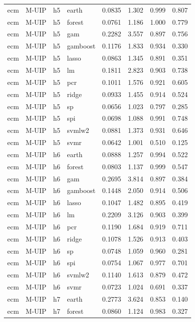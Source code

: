 \begin{ThreePartTable}
\begin{longtable}[t]{llclcccc}
\addlinespace
ecm & M-UIP & h5 & earth & 0.0835 & 1.302 & 0.999 & 0.807\\
ecm & M-UIP & h5 & forest & 0.0761 & 1.186 & 1.000 & 0.779\\
ecm & M-UIP & h5 & gam & 0.2282 & 3.557 & 0.897 & 0.756\\
ecm & M-UIP & h5 & gamboost & 0.1176 & 1.833 & 0.934 & 0.330\\
ecm & M-UIP & h5 & lasso & 0.0863 & 1.345 & 0.891 & 0.351\\
ecm & M-UIP & h5 & lm & 0.1811 & 2.823 & 0.903 & 0.738\\
ecm & M-UIP & h5 & pcr & 0.1011 & 1.576 & 0.921 & 0.605\\
ecm & M-UIP & h5 & ridge & 0.0933 & 1.455 & 0.914 & 0.524\\
ecm & M-UIP & h5 & sp & 0.0656 & 1.023 & 0.797 & 0.285\\
ecm & M-UIP & h5 & spi & 0.0698 & 1.088 & 0.991 & 0.748\\
ecm & M-UIP & h5 & svmlw2 & 0.0881 & 1.373 & 0.931 & 0.646\\
ecm & M-UIP & h5 & svmr & 0.0642 & 1.001 & 0.510 & 0.125\\
\addlinespace
ecm & M-UIP & h6 & earth & 0.0888 & 1.257 & 0.994 & 0.522\\
ecm & M-UIP & h6 & forest & 0.0803 & 1.137 & 0.999 & 0.547\\
ecm & M-UIP & h6 & gam & 0.2695 & 3.814 & 0.897 & 0.384\\
ecm & M-UIP & h6 & gamboost & 0.1448 & 2.050 & 0.914 & 0.506\\
ecm & M-UIP & h6 & lasso & 0.1047 & 1.482 & 0.895 & 0.419\\
ecm & M-UIP & h6 & lm & 0.2209 & 3.126 & 0.903 & 0.399\\
ecm & M-UIP & h6 & pcr & 0.1190 & 1.684 & 0.919 & 0.711\\
ecm & M-UIP & h6 & ridge & 0.1078 & 1.526 & 0.913 & 0.403\\
ecm & M-UIP & h6 & sp & 0.0748 & 1.059 & 0.960 & 0.281\\
ecm & M-UIP & h6 & spi & 0.0754 & 1.067 & 0.977 & 0.701\\
ecm & M-UIP & h6 & svmlw2 & 0.1140 & 1.613 & 0.879 & 0.472\\
ecm & M-UIP & h6 & svmr & 0.0723 & 1.024 & 0.691 & 0.337\\
\addlinespace
ecm & M-UIP & h7 & earth & 0.2773 & 3.624 & 0.853 & 0.140\\
ecm & M-UIP & h7 & forest & 0.0860 & 1.124 & 0.983 & 0.327\\

\end{longtable}
\end{ThreePartTable}
